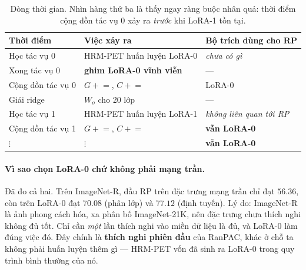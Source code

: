 \documentclass[11pt,a4paper]{article}
\begin{document}
\begin{table}[htbp]
\centering
\caption{Dòng thời gian. Nhìn hàng thứ ba là thấy ngay ràng buộc nhân quả: thời
điểm cộng dồn tác vụ 0 xảy ra \emph{trước} khi LoRA-1 tồn tại.}
\label{tab:dong-thoi-gian}
\begin{tabular}{@{}lll@{}}
\toprule
Thời điểm & Việc xảy ra & Bộ trích dùng cho RP \\
\midrule
Học tác vụ 0     & HRM-PET huấn luyện LoRA-0     & \emph{chưa có gì} \\
Xong tác vụ 0    & \textbf{ghim LoRA-0 vĩnh viễn} & --- \\
Cộng dồn tác vụ 0 & $G \mathrel{+}=$, $C \mathrel{+}=$ & LoRA-0 \\
Giải ridge       & $W_o$ cho 20 lớp              & --- \\
Học tác vụ 1     & HRM-PET huấn luyện LoRA-1     & \emph{không liên quan tới RP} \\
Cộng dồn tác vụ 1 & $G \mathrel{+}=$, $C \mathrel{+}=$ & \textbf{vẫn LoRA-0} \\
$\vdots$         & $\vdots$                      & \textbf{vẫn LoRA-0} \\
\bottomrule
\end{tabular}
\end{table}

\paragraph{Vì sao chọn LoRA-0 chứ không phải mạng trần.}
Đã đo cả hai. Trên ImageNet-R, đầu RP trên đặc trưng mạng trần chỉ đạt $56.36$,
còn trên LoRA-0 đạt $70.08$ (phân lớp) và $77.12$ (định tuyến). Lý do: ImageNet-R
là ảnh phong cách hóa, xa phân bố ImageNet-21K, nên đặc trưng chưa thích nghi
không đủ tốt. Chỉ cần \emph{một} lần thích nghi vào miền dữ liệu là đủ, và LoRA-0
làm đúng việc đó. Đây chính là \textbf{thích nghi phiên đầu} của RanPAC, khác ở
chỗ ta không phải huấn luyện thêm gì --- HRM-PET vốn đã sinh ra LoRA-0 trong quy
trình bình thường của nó.
\end{document}

